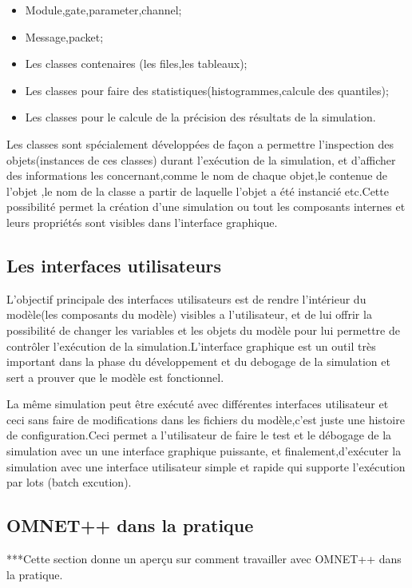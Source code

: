 \begin{itemize}

\item Module,gate,parameter,channel;
\item Message,packet;
\item Les classes contenaires (les files,les tableaux);
\item Les classes pour faire des statistiques(histogrammes,calcule des quantiles);
\item Les classes pour le calcule de la précision des résultats de la simulation.
\end{itemize} 

Les classes sont spécialement développées de façon a permettre l'inspection des objets(instances de ces classes) durant l'exécution de la simulation, et d'afficher des informations les concernant,comme le nom de chaque objet,le contenue de l'objet ,le nom de la classe a partir de laquelle l'objet a été instancié etc.Cette possibilité permet la création d'une simulation ou tout les composants internes et leurs propriétés sont visibles dans l'interface graphique.

\subsection{Les interfaces utilisateurs}
L'objectif principale des interfaces utilisateurs est de rendre l'intérieur du modèle(les composants du modèle) visibles a l'utilisateur, et de lui offrir la possibilité de changer les variables et les objets du modèle pour lui permettre de contrôler l'exécution de la simulation.L'interface graphique est un outil très important dans la phase du développement et du debogage de la simulation et sert a prouver que le modèle est fonctionnel.

La même simulation peut être exécuté avec différentes interfaces utilisateur et ceci  sans faire de modifications dans les fichiers du modèle,c'est juste une histoire de configuration.Ceci  permet  a l'utilisateur de faire le test et le débogage de la simulation avec un une interface graphique puissante, et finalement,d'exécuter la simulation avec une interface  utilisateur simple et rapide qui supporte l'exécution  par lots (batch excution).

\subsection{OMNET++ dans la pratique}
***Cette section donne un aperçu sur comment travailler avec OMNET++ dans la pratique.


